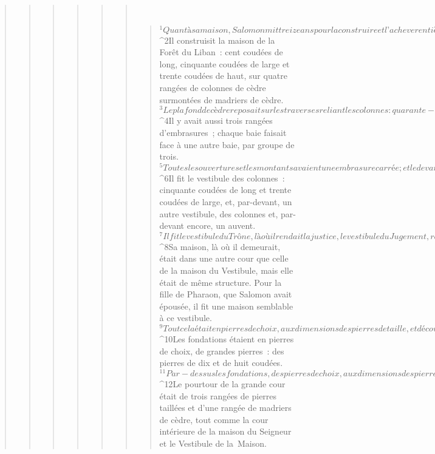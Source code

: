 \begin{verse}
\begin{verse}
\begin{verse}
\begin{verse}
\begin{verse}
\begin{verse}
         
      \bchapter{}
      \begin{verse}
${}^{1}Quant à sa maison, Salomon mit treize ans pour la construire et l’achever entièrement. 
${}^{2}Il construisit la maison de la Forêt du Liban : cent coudées de long, cinquante coudées de large et trente coudées de haut, sur quatre rangées de colonnes de cèdre surmontées de madriers de cèdre. 
${}^{3}Le plafond de cèdre reposait sur les traverses reliant les colonnes : quarante-cinq traverses, quinze par colonnade. 
${}^{4}Il y avait aussi trois rangées d’embrasures ; chaque baie faisait face à une autre baie, par groupe de trois. 
${}^{5}Toutes les ouvertures et les montants avaient une embrasure carrée ; et le devant de chaque baie faisait face à une autre baie, par groupe de trois. 
${}^{6}Il fit le vestibule des colonnes : cinquante coudées de long et trente coudées de large, et, par-devant, un autre vestibule, des colonnes et, par-devant encore, un auvent. 
${}^{7}Il fit le vestibule du Trône, là où il rendait la justice, le vestibule du Jugement, recouvert de cèdre, d’un bout à l’autre du sol. 
${}^{8}Sa maison, là où il demeurait, était dans une autre cour que celle de la maison du Vestibule, mais elle était de même structure. Pour la fille de Pharaon, que Salomon avait épousée, il fit une maison semblable à ce vestibule. 
${}^{9}Tout cela était en pierres de choix, aux dimensions des pierres de taille, et découpées à la scie, à l’intérieur comme à l’extérieur, des fondations jusqu’aux corniches, et de l’extérieur jusqu’à la grande cour. 
${}^{10}Les fondations étaient en pierres de choix, de grandes pierres : des pierres de dix et de huit coudées. 
${}^{11}Par-dessus les fondations, des pierres de choix, aux dimensions des pierres de taille, et du cèdre. 
${}^{12}Le pourtour de la grande cour était de trois rangées de pierres taillées et d’une rangée de madriers de cèdre, tout comme la cour intérieure de la maison du Seigneur et le Vestibule de la Maison.
      

\end{verse}
\end{verse}
\end{verse}
\end{verse}
\end{verse}
\end{verse}
\end{verse}
